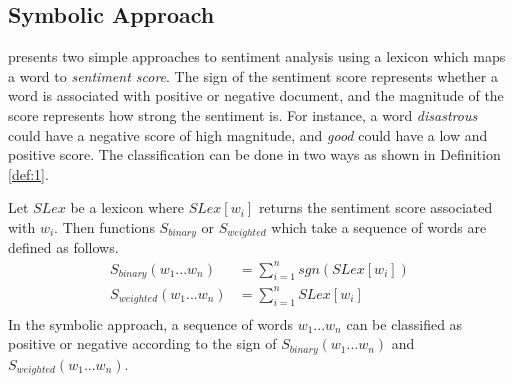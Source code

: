 \subsection{Symbolic Approach}
\cite{wilson2005recognizing} presents two simple approaches to sentiment analysis using a lexicon which maps a word to {\em sentiment score}. The sign of the sentiment score represents whether a word is associated with positive or negative document, and the magnitude of the score represents how strong the sentiment is. For instance, a word {\em disastrous} could have a negative score of high magnitude, and {\em good} could have a low and positive score. The classification can be done in two ways as shown in Definition \ref{def:1}.
\begin{definition}
\label{def:1}
Let $SLex$ be a lexicon where $SLex[w_i]$ returns the sentiment score associated with $w_i$. Then functions $S_{binary}$ or $S_{weighted}$ which take a sequence of words are defined as follows.
\begin{align*}
S_{binary}(w_1 ... w_n) &= \sum\limits_{i=1}^{n}sgn(SLex[w_i])\\
S_{weighted}(w_1 ... w_n) &= \sum\limits_{i=1}^{n}SLex[w_i]\\
\end{align*}
In the symbolic approach, a sequence of words $w_1 ... w_n$ can be classified as positive or negative according to the sign of $S_{binary}(w_1 ... w_n)$ and $S_{weighted}(w_1 ... w_n)$. 
\end{definition}
